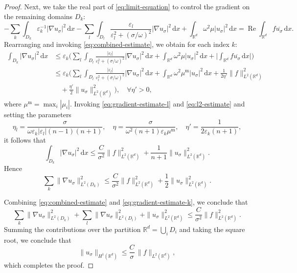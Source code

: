 \documentclass[12pt,reqno]{amsart}
\numberwithin{equation}{section}
\begin{document}
\begin{proof}
Next, we take the real part of \eqref{eq:limit-equation} to control the gradient on the remaining domains $D_k$:
\begin{equation*}
    -\sum_{k} \int_{D_k} \varepsilon_k^{-1} |\nabla u_\sigma|^2\,\mathrm{d}x - \sum_{l} \int_{D_l}\dfrac{\varepsilon_l}{\varepsilon_l^2+(\sigma/\omega)^2} |\nabla u_\sigma|^2\,\mathrm{d}x + \int_{\mathbb{R}^d} \omega^2 \mu |u_\sigma|^2\,\mathrm{d}x = \operatorname{Re} \int_{\mathbb{R}^d} f\overline{u_\sigma}\,\mathrm{d}x.
\end{equation*}
Rearranging and invoking \eqref{eq:combined-estimate}, we obtain for each index $k$:
\begin{align*}
\int_{D_k} |\nabla u_\sigma|^2\,\mathrm{d}x &\leq \varepsilon_k\biggl(\sum_{l} \int_{D_l} \frac{|\varepsilon_l|}{\varepsilon_l^2 + (\sigma/\omega)^2} |\nabla u_\sigma|^2\,\mathrm{d}x + \int_{\mathbb{R}^d} \omega^2 \mu |u_\sigma|^2\,\mathrm{d}x + \biggl|\int_{\mathbb{R}^d} f\overline{u_\sigma}\,\mathrm{d}x\biggr|\biggr) \\
&\leq \varepsilon_k\biggl(\sum_{l} \int_{D_l} \frac{|\varepsilon_l|}{\varepsilon_l^2 + (\sigma/\omega)^2} |\nabla u_\sigma|^2\,\mathrm{d}x + \int_{\mathbb{R}^d} \omega^2 \mu^{\mathrm{m}} |u_\sigma|^2\,\mathrm{d}x + \frac{1}{2\eta'}\|f\|_{L^2(\mathbb{R}^d)}^2\\
&\quad+ \frac{\eta'}{2}\|u_\sigma\|_{L^2(\mathbb{R}^d)}^2\biggr),\quad\forall\eta'>0,
\end{align*}
where $\mu^{\mathrm{m}} = \max_i |\mu_i|$. Invoking \eqref{eq:gradient-estimate-l} and \eqref{eq:l2-estimate} and setting the parameters
\[
\eta_l = \frac{\sigma}{\omega\varepsilon_k |\varepsilon_l| (n-1)(n+1)}, \quad \eta = \frac{\sigma}{\omega^2(n+1)\varepsilon_k \mu^{\mathrm{m}}}, \quad \eta' = \frac{1}{2\varepsilon_k(n+1)},
\]
it follows that
\[
\int_{D_k} |\nabla u_\sigma|^2\,\mathrm{d}x \leq \frac{C}{\sigma^2}\|f\|_{L^2(\mathbb{R}^d)}^2 + \frac{1}{n+1}\|u_\sigma\|_{L^2(\mathbb{R}^d)}^2.
\]
Hence
\begin{equation}\label{eq:gradient-estimate-k}
\sum_{k} \|\nabla u_\sigma\|_{L^2(D_k)}^2 \leq \frac{C}{\sigma^2}\|f\|_{L^2(\mathbb{R}^d)}^2 + \frac{1}{2}\|u_\sigma\|_{L^2(\mathbb{R}^d)}^2.
\end{equation}

Combining \eqref{eq:combined-estimate} and \eqref{eq:gradient-estimate-k}, we conclude that
\[
\sum_{k} \|\nabla u_\sigma\|_{L^2(D_k)}^2 + \sum_{l} \|\nabla u_\sigma\|_{L^2(D_l)}^2 + \|u_\sigma\|_{L^2(\mathbb{R}^d)}^2 \leq \frac{C}{\sigma^2}\|f\|_{L^2(\mathbb{R}^d)}^2.
\]
Summing the contributions over the partition $\mathbb{R}^d = \bigcup_i D_i$ and taking the square root, we conclude that
\begin{equation*}
	\|u_\sigma\|_{H^1(\mathbb{R}^d)} \le \frac{C}{\sigma}\, \|f\|_{L^2(\mathbb{R}^d)},
\end{equation*}
which completes the proof.



\end{proof}
\end{document}
